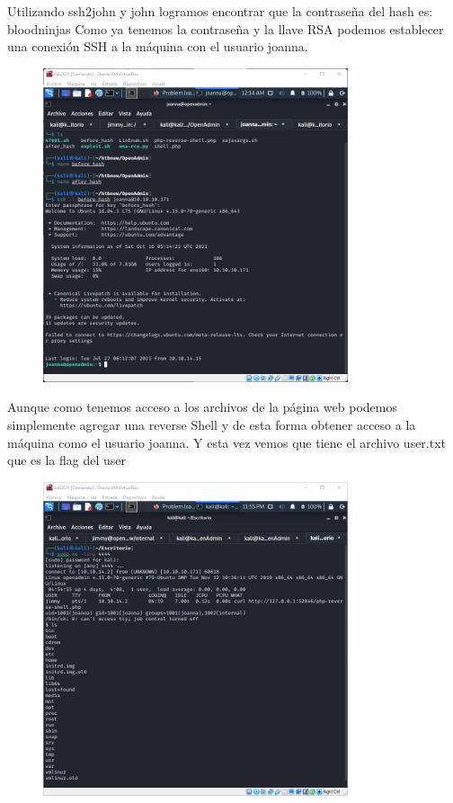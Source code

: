 \documentclass{article}
\begin{document}
Utilizando ssh2john y john logramos encontrar que la contraseña del hash es: bloodninjas
Como ya tenemos la contraseña y la llave RSA podemos establecer una conexión SSH a la máquina con el usuario joanna.
\begin{figure}[h]
	\center
	\includegraphics[width=0.8\textwidth]{images/openadmin/16-sshjoanna.png}
	\caption{}
\end{figure}

Aunque como tenemos acceso a los archivos de la página web podemos simplemente agregar una reverse Shell y de esta forma obtener acceso a la máquina como el usuario joanna. Y esta vez vemos que tiene el archivo user.txt que es la flag del user
\begin{figure}[h]
	\center
	\includegraphics[width=0.8\textwidth]{images/openadmin/17-alternativa.png}
	\caption{}
\end{figure}
\end{document}
